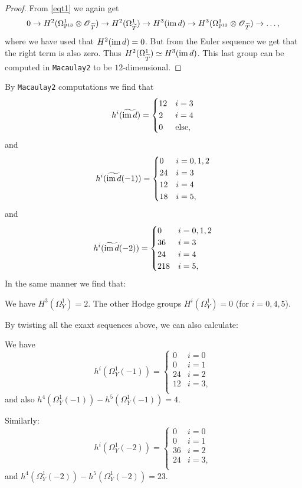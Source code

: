 \documentclass[11pt, english]{article}
\begin{document}
\begin{proof}
From \eqref{eqt1} we again get 
\[
0 \to H^2(\Omega_{\mathbb{P}^{13}}^1 \otimes \operatorname{\mathscr{O}}_{\widetilde T}) \to H^2(\Omega_{\widetilde T}^1) \to H^3(\operatorname{im} d) \to H^3(\Omega_{\mathbb{P}^{13}}^1 \otimes \operatorname{\mathscr{O}}_{\widetilde T}) \to \ldots ,
\]
where we have used that $H^2(\operatorname{im} d)=0$. But from the Euler sequence we get that the right term is also zero. Thus $H^2(\Omega_{\widetilde T}^1) \simeq H^3(\operatorname{im} d)$. This last group can be computed in \verb|Macaulay2| to be $12$-dimensional. 
\end{proof}

By \verb|Macaulay2| computations we find that
\[
h^i(\widetilde{\operatorname{im} d}) = \begin{cases}
12 & i=3\\ 
2 & i = 4  \\
0 & \text{else},
\end{cases}
\]
and
\[
h^i(\widetilde{\operatorname{im} d}(-1)) = \begin{cases}
0 & i=0,1,2\\ 
24 & i = 3  \\
12 & i= 4 \\
18 & i = 5,
\end{cases}
\]
and
\[
h^i(\widetilde{\operatorname{im} d}(-2)) = \begin{cases}
0 & i=0,1,2\\ 
36 & i = 3  \\
24 & i= 4 \\
218 & i = 5,
\end{cases}
\]
In the same manner we find that:

\begin{prop}
We have $H^3(\Omega_Y^1)=2$. The other Hodge groups $H^i(\Omega_Y^1)=0$ (for $i=0,4,5$).
\end{prop}

By twisting all the exaxt sequences above, we can also calculate:
\begin{prop}
 We have
\[
h^i(\Omega_Y^1(-1)) = \begin{cases}
0 & i=0 \\
0 & i=1 \\
24 & i= 2 \\
12 & i = 3, \\
\end{cases}
\]
and also $h^4(\Omega_Y^1(-1))-h^5(\Omega_Y^1(-1))=4$.

Similarly:
\[
h^i(\Omega_Y^1(-2)) = \begin{cases}
0 & i=0 \\
0 & i=1 \\
36 & i= 2 \\
24 & i = 3, \\
\end{cases}
\]
and $h^4(\Omega_Y^1(-2))-h^5(\Omega_Y^1(-2))=23$.
\end{prop}
\end{document}
